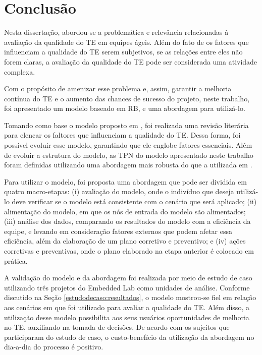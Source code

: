 \chapter{Conclusão}
\label{conclusao}

Nesta dissertação, abordou-se a problemática e relevância relacionadas à avaliação da qualidade do TE em equipes ágeis. Além do fato de os fatores que influenciam a qualidade do TE serem subjetivos, se as relações entre eles não forem claras, a avaliação da qualidade do TE pode ser considerada uma atividade complexa.

Com o propósito de amenizar esse problema e, assim, garantir a melhoria contínua do TE e o aumento das chances de sucesso do projeto, neste trabalho, foi apresentado um modelo baseado em RB, e uma abordagem para utilizá-lo.

Tomando como base o modelo proposto em \cite{freire}, foi realizada uma revisão literária para elencar os faltores que influenciam a qualidade do TE. Dessa forma, foi possível evoluir esse modelo, garantindo que ele englobe fatores essenciais. Além de evoluir a estrutura do modelo, as TPN do modelo apresentado neste trabalho foram definidas utilizando uma abordagem mais robusta do que a utilizada em \cite{freire}.

Para utilizar o modelo, foi proposta uma abordagem que pode ser dividida em quatro macro-etapas: (i) avaliação do modelo, onde o indivíduo que deseja utilizá-lo deve verificar se o modelo está consistente com o cenário que será aplicado; (ii) alimentação do modelo, em que os nós de entrada do modelo são alimentados; (iii) análise dos dados, comparando os resultados do modelo com a eficiência da equipe, e levando em consideração fatores externos que podem afetar essa eficiência, além da elaboração de um plano corretivo e preventivo; e (iv) ações corretivas e preventivas, onde o plano elaborado na etapa anterior é colocado em prática.

A validação do modelo e da abordagem foi realizada por meio de estudo de caso utilizando três projetos do Embedded Lab como unidades de análise. Conforme discutido na Seção \ref{estudodecaso:resultados}, o modelo mostrou-se fiel em relação aos cenários em que foi utilizado para avaliar a qualidade do TE. Além disso, a utilização desse modelo possibilita aos seus usuários oportunidades de melhoria no TE, auxiliando na tomada de decisões. De acordo com os sujeitos que participaram do estudo de caso, o custo-benefício da utilização da abordagem no dia-a-dia do processo é positivo.

